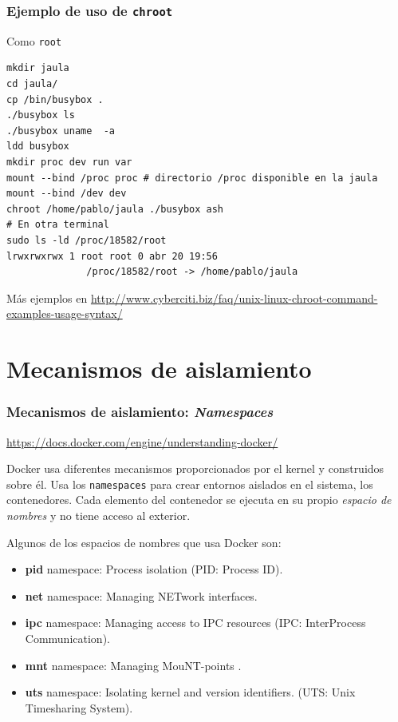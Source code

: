 \documentclass[xcolor=dvipsnames]{beamer}
\begin{document}
\begin{frame}[fragile]
	\frametitle{Ejemplo de uso de \texttt{chroot}}
	Como \texttt{root}
	\begin{lstlisting}
mkdir jaula
cd jaula/
cp /bin/busybox .
./busybox ls
./busybox uname  -a
ldd busybox
mkdir proc dev run var
mount --bind /proc proc # directorio /proc disponible en la jaula
mount --bind /dev dev 
chroot /home/pablo/jaula ./busybox ash
# En otra terminal
sudo ls -ld /proc/18582/root
lrwxrwxrwx 1 root root 0 abr 20 19:56 
              /proc/18582/root -> /home/pablo/jaula
	\end{lstlisting}
Más ejemplos en {\small \url{http://www.cyberciti.biz/faq/unix-linux-chroot-command-examples-usage-syntax/}}
\end{frame}





\section{Mecanismos de aislamiento}
\begin{frame}[fragile]
	\frametitle{Mecanismos de aislamiento: \textit{Namespaces}}

{\scriptsize \url{https://docs.docker.com/engine/understanding-docker/} }

Docker usa diferentes mecanismos proporcionados por el kernel y construidos sobre él. Usa los \texttt{namespaces} para crear entornos aislados en el sistema, los contenedores. Cada elemento del contenedor se ejecuta en su propio \textit{espacio de nombres} y no tiene acceso al exterior.

Algunos de los espacios de nombres que usa Docker son:
		\begin{itemize}
			\item \textbf{pid} namespace: Process isolation (PID: Process ID).
			\item \textbf{net} namespace: Managing NETwork interfaces.
			\item \textbf{ipc} namespace: Managing access to IPC resources (IPC: InterProcess Communication).
			\item  \textbf{mnt} namespace: Managing MouNT-points .
			\item \textbf{uts} namespace: Isolating kernel and version identifiers. (UTS: Unix Timesharing System).
		\end{itemize}
\end{frame}
\end{document}
